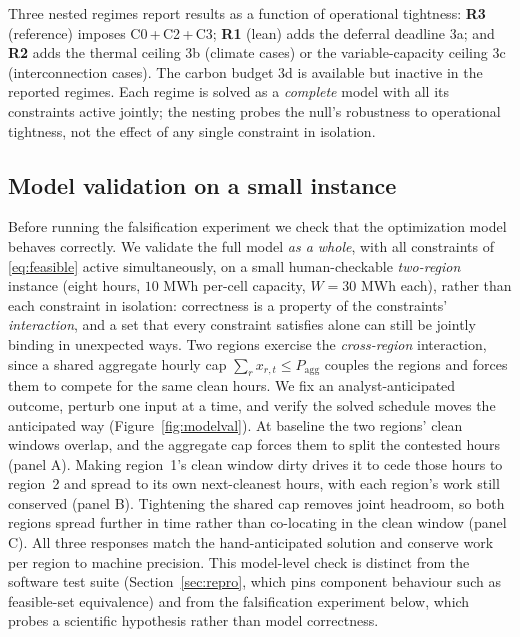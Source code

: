 \documentclass[12pt]{article}
\begin{document}
Three nested regimes report results as a function of operational tightness:
\textbf{R3} (reference) imposes C0\,+\,C2\,+\,C3; \textbf{R1} (lean) adds the deferral
deadline 3a; and \textbf{R2} adds the thermal ceiling 3b (climate cases) or the
variable-capacity ceiling 3c (interconnection cases). The carbon budget 3d is
available but inactive in the reported regimes. Each regime is solved as a
\emph{complete} model with all its constraints active jointly; the nesting probes
the null's robustness to operational tightness, not the effect of any single
constraint in isolation.

\subsection{Model validation on a small instance}\label{sec:modelval}
Before running the falsification experiment we check that the optimization model
behaves correctly. We validate the full model \emph{as a whole}, with all constraints
of \eqref{eq:feasible} active simultaneously, on a small human-checkable
\emph{two-region} instance (eight hours, $10$ MWh per-cell capacity, $W=30$ MWh
each), rather than each constraint in isolation: correctness is a property of the
constraints' \emph{interaction}, and a set that every constraint satisfies alone can
still be jointly binding in unexpected ways. Two regions exercise the
\emph{cross-region} interaction, since a shared aggregate hourly cap
$\sum_r x_{r,t}\le P_{\mathrm{agg}}$ couples the regions and forces them to compete
for the same clean hours. We fix an analyst-anticipated outcome, perturb one input
at a time, and verify the solved schedule moves the anticipated way
(Figure~\ref{fig:modelval}). At baseline the two regions' clean
windows overlap, and the aggregate cap forces them to split the contested hours
(panel A). Making region~1's clean window dirty drives it to cede those hours to
region~2 and spread to its own next-cleanest hours, with each region's work still
conserved (panel B). Tightening the shared cap removes joint headroom, so both
regions spread further in time rather than co-locating in the clean window (panel C).
All three responses match the hand-anticipated solution and conserve work per region
to machine precision. This model-level check is distinct from the software test suite
(Section~\ref{sec:repro}, which pins component behaviour such as feasible-set
equivalence) and from the falsification experiment below, which probes a scientific
hypothesis rather than model correctness.
\end{document}

